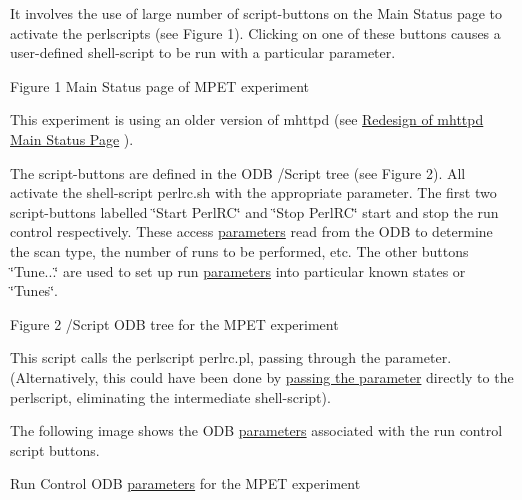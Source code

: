 It involves the use of large number of script-\/buttons on the Main Status page to activate the perlscripts (see Figure 1). Clicking on one of these buttons causes a user-\/defined shell-\/script to be run with a particular parameter.

\par
\par
\par
 \begin{center} Figure 1 Main Status page of MPET experiment   \end{center}  \par
\par
\par


This experiment is using an older version of mhttpd (see \hyperlink{RC_mhttpd_status_page_redesign}{Redesign of mhttpd Main Status Page} ).

The script-\/buttons are defined in the ODB /Script tree (see Figure 2). All activate the shell-\/script perlrc.sh with the appropriate parameter. The first two script-\/buttons labelled \char`\"{}Start PerlRC\char`\"{} and \char`\"{}Stop PerlRC\char`\"{} start and stop the run control respectively. These access \hyperlink{structparameters}{parameters} read from the ODB to determine the scan type, the number of runs to be performed, etc. The other buttons \char`\"{}Tune...\char`\"{} are used to set up run \hyperlink{structparameters}{parameters} into particular known states or \char`\"{}Tunes\char`\"{}.

\par
 \par
\par
\par
 \begin{center} Figure 2 /Script ODB tree for the MPET experiment   \end{center}  \par
\par
\par


This script calls the perlscript perlrc.pl, passing through the parameter. (Alternatively, this could have been done by \hyperlink{RC_mhttpd_defining_script_buttons_RC_odb_script_tree}{passing the parameter} directly to the perlscript, eliminating the intermediate shell-\/script).

The following image shows the ODB \hyperlink{structparameters}{parameters} associated with the run control script buttons.

\par
\par
\par
 \begin{center} Run Control ODB \hyperlink{structparameters}{parameters} for the MPET experiment   \end{center}  \par
\par
\par
 
